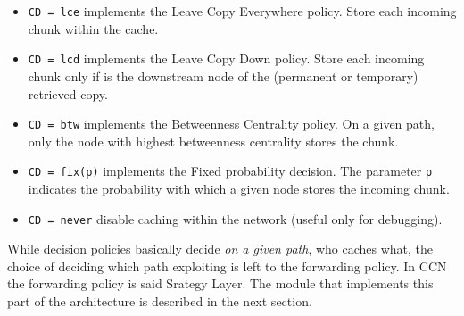 \documentclass{article}
\begin{document}
\begin{itemize}
    \item \verb|CD = lce| implements the Leave Copy Everywhere policy. Store each incoming chunk within the cache. 
    \item \verb|CD = lcd| implements the Leave Copy Down policy. Store each incoming chunk only if is the downstream node of the (permanent or temporary) retrieved copy.
    \item \verb|CD = btw| implements the Betweenness Centrality policy. On a given path, only the node with highest betweenness centrality stores the chunk.
    \item \verb|CD = fix(p)| implements the Fixed probability decision. The parameter \verb|p| indicates the probability with which a given node stores the incoming chunk.
    \item \verb|CD = never| disable caching within the network (useful only for debugging).
\end{itemize}

While decision policies basically decide \emph{on a given path}, who caches what, the choice of deciding which path exploiting is left to the forwarding policy. In CCN the forwarding policy is said Srategy Layer. The module that implements this part of the architecture is described in the next section.
\end{document}
